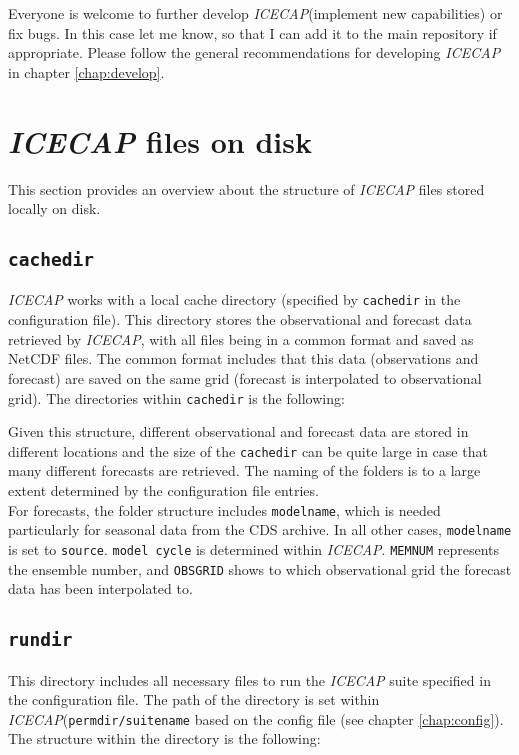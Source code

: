 \documentclass[DIV=10, parskip=full]{scrreprt}
\newcommand{\ice}{\textit{ICECAP}\xspace}
\begin{document}
Everyone is welcome to further develop \ice (implement new capabilities) or fix bugs. In this case let me know, so that I can add it to the main repository if appropriate. Please follow the general recommendations for developing \ice in chapter \ref{chap:develop}.


\section{\ice files on disk} \label{chap:files}
This section provides an overview about the structure of \ice files stored locally on disk. 

\subsection{\texttt{cachedir}}

\ice works with a local cache directory (specified by \texttt{cachedir} in the configuration file). This directory stores the observational and forecast data retrieved by \ice, with all files being in a common format and saved as NetCDF files. The common format includes that this data (observations and forecast) are saved on the same grid (forecast is interpolated to observational grid). The directories within \texttt{cachedir} is the following:\\


Given this structure, different observational and forecast data are stored in different locations and the size of the \texttt{cachedir} can be quite large in case that many different forecasts are retrieved. The naming of the folders is to a large extent determined by the configuration file entries.\\
For forecasts, the folder structure includes \texttt{modelname}, which is needed particularly for seasonal data from the CDS archive. In all other cases, \texttt{modelname} is set to \texttt{source}. \texttt{model cycle} is determined within \ice. \texttt{MEMNUM} represents the ensemble number, and \texttt{OBSGRID} shows to which observational grid the forecast data has been interpolated to. 
	
\subsection{\texttt{rundir}}
This directory includes all necessary files to run the \ice suite specified in the configuration file. The path of the directory is set within \ice  (\texttt{permdir/suitename} based on the config file (see chapter \ref{chap:config}). The structure within the directory is the following:\\
\end{document}
